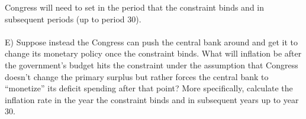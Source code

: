 \begin{homeworkProblem}[1]
    Congress will need to set in the period that the constraint binds and in subsequent
    periods (up to period 30). 
    \\ \\
    E) Suppose instead the Congress can push the central bank around and get it to change 
    its monetary policy once the constraint binds. What will inflation be after the government's
    budget hits the constraint under the assumption that Congress doesn't change the primary
    surplus but rather forces the central bank to ``monetize'' its deficit spending after that 
    point? More specifically, calculate the inflation rate in the year the constraint binds and
    in subsequent years up to year 30. 
    
    \pagebreak
    
\end{homeworkProblem}